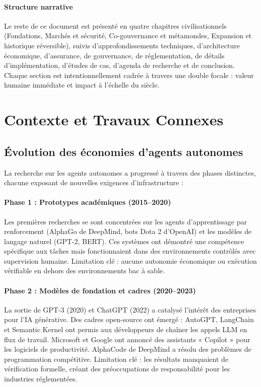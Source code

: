 \documentclass[11pt]{article}
\begin{document}
\paragraph{Structure narrative} Le reste de ce document est présenté en quatre chapitres civilisationnels (Fondations, Marchés et sécurité, Co-gouvernance et métamondes, Expansion et historique réversible), suivis d'approfondissements techniques, d'architecture économique, d'assurance, de gouvernance, de réglementation, de détails d'implémentation, d'études de cas, d'agenda de recherche et de conclusion. Chaque section est intentionnellement cadrée à travers une double focale : valeur humaine immédiate et impact à l'échelle du siècle.

\section{Contexte et Travaux Connexes}
\subsection{Évolution des économies d'agents autonomes}
La recherche sur les agents autonomes a progressé à travers des phases distinctes, chacune exposant de nouvelles exigences d'infrastructure :

\paragraph{Phase 1 : Prototypes académiques (2015--2020)} Les premières recherches se sont concentrées sur les agents d'apprentissage par renforcement (AlphaGo de DeepMind, bots Dota 2 d'OpenAI) et les modèles de langage naturel (GPT-2, BERT). Ces systèmes ont démontré une compétence spécifique aux tâches mais fonctionnaient dans des environnements contrôlés avec supervision humaine. Limitation clé : aucune autonomie économique ou exécution vérifiable en dehors des environnements bac à sable.

\paragraph{Phase 2 : Modèles de fondation et cadres (2020--2023)} La sortie de GPT-3 (2020) et ChatGPT (2022) a catalysé l'intérêt des entreprises pour l'IA générative. Des cadres open-source ont émergé : AutoGPT, LangChain et Semantic Kernel ont permis aux développeurs de chaîner les appels LLM en flux de travail. Microsoft et Google ont annoncé des assistants « Copilot » pour les logiciels de productivité. AlphaCode de DeepMind a résolu des problèmes de programmation compétitive. Limitation clé : les résultats manquaient de vérification formelle, créant des préoccupations de responsabilité pour les industries réglementées.
\end{document}
